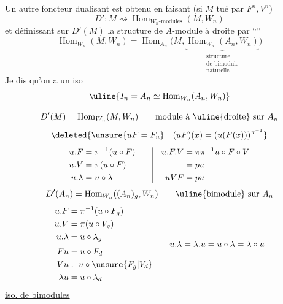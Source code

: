 Un autre foncteur dualisant est obtenu en faisant (si $M$ tué par $F^n,V^n$)
\[
D':M\rightsquigarrow\operatorname{Hom}_{W_n\text{-modules}}(M,W_n)
\]
et définissant sur $D'(M)$ la structure de $A$-module à droite par ``''
\[
\operatorname{Hom}_{W_n}(M,W_n)=\operatorname{Hom}_{A_n}\bigl(M,\underbrace{\operatorname{Hom}_{W_n}(A_n,W_n)}_{\substack{\text{structure}\\\text{de bimodule}\\\text{naturelle}}}\bigr)
\]
Je dis qu'on a un iso
\[
\uline{I_n=A_n\simeq\operatorname{Hom}_{W_n}(A_n,W_n)}
\]

\[
D'(M)=\operatorname{Hom}_{W_n}(M,W_n)\qquad\text{module à \uline{droite} sur }A_n
\]
\[
\deleted{\unsure{uF=F_u}\quad(uF)(x)=(u(F(x)))^{\pi^{-1}}}
\]
\[
\begin{aligned}u.F&=\pi^{-1}(u\circ F)\\u.V&=\pi(u\circ F)\\u.\lambda&=u\circ\lambda\end{aligned}
\qquad\vrule\quad\begin{aligned}u.F.V&=\pi\pi^{-1}u\circ F\circ V\\&=pu\\uVF&=pu\mathbin{-}\end{aligned}
\]
\[
D'(A_n)=\operatorname{Hom}_{W_n}((A_n)_g,W_n)\qquad\text{\uline{bimodule} sur }A_n
\]
\[
\begin{aligned}
u.F&=\pi^{-1}(u\circ F_g)\\u.V&=\pi(u\circ V_g)\\u.\lambda&=u\circ\underline{\lambda_g}\\Fu&=u\circ F_d\\Vu&:\ u\circ\unsure{F_g|V_d}\\\lambda u&=u\circ\lambda_d
\end{aligned}
\qquad u.\lambda=\lambda.u=u\circ\lambda=\lambda\circ u
\]
\uline{iso. de bimodules}
